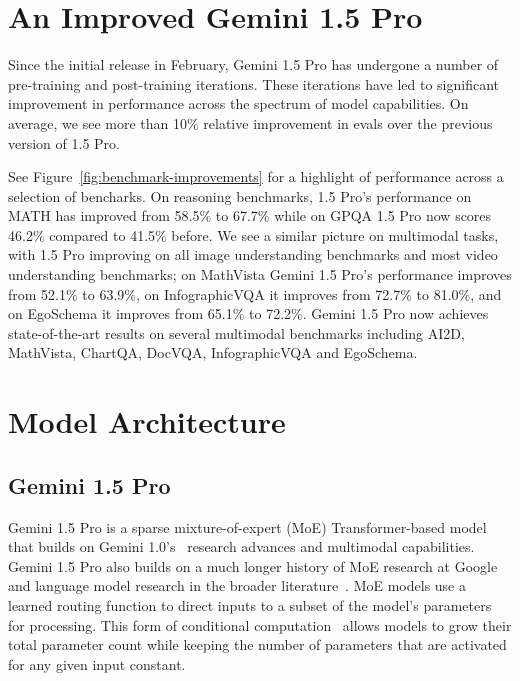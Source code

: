 \section{An Improved Gemini 1.5 Pro}

Since the initial release in February, Gemini 1.5 Pro has undergone a number of pre-training and post-training iterations. These iterations have led to significant improvement in performance across the spectrum of model capabilities. On average, we see more than 10\% relative improvement in evals over the previous version of 1.5 Pro.

See Figure~\ref{fig:benchmark-improvements} for a highlight of performance across a selection of bencharks. On reasoning benchmarks, 1.5 Pro's performance on MATH \citep{hendrycks2021measuring} has improved from 58.5\% to 67.7\% while on GPQA \citep{rein2023gpqa}  1.5 Pro now scores 46.2\% compared to 41.5\% before. We see a similar picture on multimodal tasks, with  1.5 Pro improving on all image understanding benchmarks and most video understanding benchmarks; on MathVista \citep{mathvista} Gemini 1.5 Pro's performance improves from 52.1\% to 63.9\%, on InfographicVQA \citep{infographicvqa} it improves from 72.7\% to 81.0\%, and on EgoSchema \citep{mangalam2023egoschema} it improves from 65.1\% to 72.2\%.  Gemini 1.5 Pro now achieves state-of-the-art results on several multimodal benchmarks including AI2D, MathVista, ChartQA, DocVQA, InfographicVQA and EgoSchema.  

\section{Model Architecture}
\label{sec:arch}

\subsection{Gemini 1.5 Pro} Gemini 1.5 Pro is a sparse mixture-of-expert (MoE) Transformer-based model that builds on Gemini 1.0’s~\cite{geminiteam2023gemini} research advances and multimodal capabilities. Gemini 1.5 Pro also builds on a much longer history of MoE research at Google~\citep{shazeer2017outrageously, lepikhin2020gshard, fedus2021switch, du_glam_2021, riquelme2021scaling, clark2022unified, zoph2022designing} and language model research in the broader literature~\citep{gopher, chinchilla, palm, palm2, raffel2019exploring, llama, llama2, thoppilan2022lamda, gpt3, gpt4, jiang2024mixtral, roller2021hash, kim2021scalable, claude, vaswani2017}. MoE models use a learned routing function to direct inputs to a subset of the model’s parameters for processing. This form of conditional computation~\cite{jacobs1991adaptive, bengio2013estimating, davis2014lowrank} allows models to grow their total parameter count while keeping the number of parameters that are activated for any given input constant.

